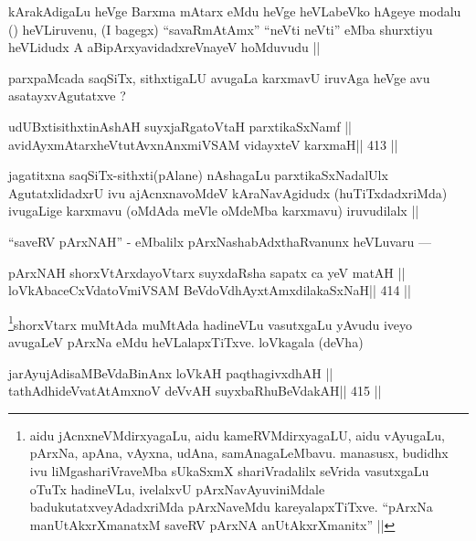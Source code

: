 \begin{artha}
kArakAdigaLu heVge Barxma mAtarx eMdu heVge heVLabeVko hAgeye modalu (\quad) heVLiruvenu, (I bagegx) ``savaRmAtAmx'' ``neVti neVti'' eMba shurxtiyu heVLidudx A aBipArxyavidadxreVnayeV hoMduvudu ||
\end{artha}

\begin{artha}
parxpaMcada saqSiTx, sithxtigaLU avugaLa karxmavU iruvAga heVge avu asatayxvAgutatxve ?
\end{artha}

\begin{shl}
udUBxtisithxtinAshAH suyxjaRgatoV\s taH parxtikaSxNamf ||
avidAyxmAtarxheVtutAvxnAnxmiVSAM vidayxteV karxmaH\hfill || 413 ||
\end{shl}

\begin{artha}
jagatitxna saqSiTx-sithxti(pAlane) nAshagaLu parxtikaSxNadalUlx AgutatxlidadxrU ivu ajAcnxnavoMdeV kAraNavAgidudx (huTiTxdadxriMda) ivugaLige karxmavu (oMdAda meVle oMdeMba karxmavu) iruvudilalx ||
\end{artha}

\begin{artha}
``saveRV pArxNAH'' - eMbalilx pArxNashabAdxthaRvanunx heVLuvaru ---
\end{artha}

\begin{shl}
pArxNAH shorxVtArxdayoV\s tarx suyxdaRsha sapatx ca yeV matAH ||
loVkAbaceCxVdatoV\s miVSAM BeVdoV\s dhAyxtAmxdilakaSxNaH\hfill || 414 ||
\end{shl}

\footnote[1]{aidu jAcnxneVMdirxyagaLu, aidu kameRVMdirxyagaLU, aidu vAyugaLu, pArxNa, apAna, vAyxna, udAna, samAnagaLeMbavu. manasusx, budidhx ivu liMgashariVraveMba sUkaSxmX shariVradalilx seVrida vasutxgaLu oTuTx hadineVLu, ivelalxvU pArxNavAyuviniMdale badukutatxveyAdadxriMda pArxNaveMdu kareyalapxTiTxve. ``pArxNa manUtAkxrXmanatxM saveRV pArxNA anUtAkxrXmanitx'' ||}shorxVtarx muMtAda muMtAda hadineVLu vasutxgaLu yAvudu iveyo avugaLeV pArxNa eMdu heVLalapxTiTxve. loVkagala (deVha)

\begin{shl}
\footnotemark[2]jarAyujAdisaMBeVdaBinAnx loVkAH paqthagivxdhAH ||
tathA\s dhideVvatAtAmxnoV deVvAH suyxbaRhuBeVdakAH\hfill || 415 ||
\end{shl}

